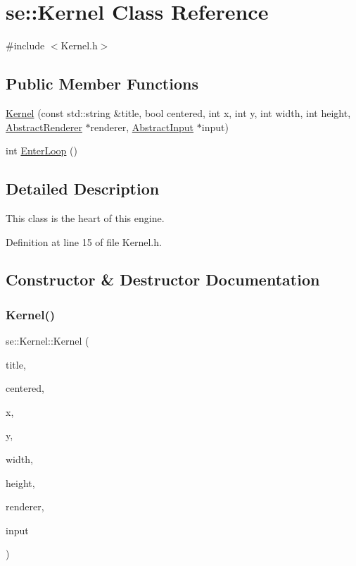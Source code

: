 \hypertarget{classse_1_1_kernel}{}\section{se\+:\+:Kernel Class Reference}
\label{classse_1_1_kernel}


{\ttfamily \#include $<$Kernel.\+h$>$}

\subsection*{Public Member Functions}
\begin{DoxyCompactItemize}
\item 
\mbox{\hyperlink{classse_1_1_kernel_abc8105369975f3df1199537b6efe5214}{Kernel}} (const std\+::string \&title, bool centered, int x, int y, int width, int height, \mbox{\hyperlink{classse_1_1_abstract_renderer}{Abstract\+Renderer}} $\ast$renderer, \mbox{\hyperlink{classse_1_1_abstract_input}{Abstract\+Input}} $\ast$input)
\item 
int \mbox{\hyperlink{classse_1_1_kernel_a1faeac6fce02ccd7ff76d94ad78e0754}{Enter\+Loop}} ()
\end{DoxyCompactItemize}


\subsection{Detailed Description}
This class is the heart of this engine. 

Definition at line 15 of file Kernel.\+h.



\subsection{Constructor \& Destructor Documentation}
\mbox{\label{classse_1_1_kernel_abc8105369975f3df1199537b6efe5214}} 
\subsubsection{\texorpdfstring{Kernel()}{Kernel()}}
{\footnotesize\ttfamily se\+::\+Kernel\+::\+Kernel (\begin{DoxyParamCaption}\item[{const std\+::string \&}]{title,  }\item[{bool}]{centered,  }\item[{int}]{x,  }\item[{int}]{y,  }\item[{int}]{width,  }\item[{int}]{height,  }\item[{\mbox{\hyperlink{classse_1_1_abstract_renderer}{Abstract\+Renderer}} $\ast$}]{renderer,  }\item[{\mbox{\hyperlink{classse_1_1_abstract_input}{Abstract\+Input}} $\ast$}]{input }\end{DoxyParamCaption})}

